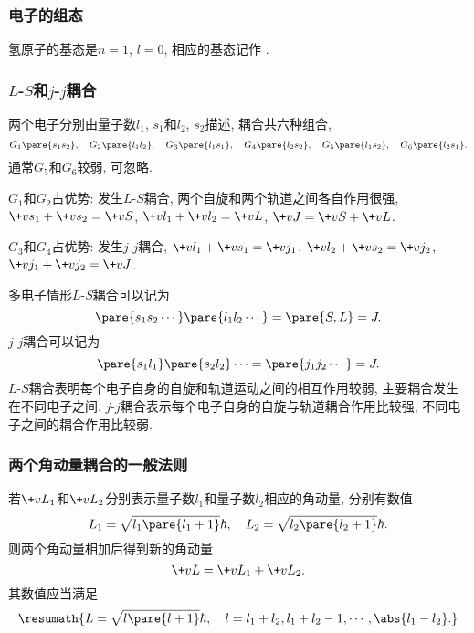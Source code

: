 \documentclass[hidelinks]{ctexart}
\begin{document}
\subsubsection{电子的组态} %
\label{ssub:电子的组态}

氢原子的基态是$n=1$, $l=0$, 相应的基态记作 .


\subsubsection{\texorpdfstring{$L$-$S$}{L-S}和\texorpdfstring{$j$-$j$}{j-j}耦合} %
\label{ssub:l_s和j_j耦合}

两个电子分别由量子数$l_1$, $s_1$和$l_2$, $s_2$描述, 耦合共六种组合,
\[ G_1\pare{s_1s_2},\quad G_2\pare{l_1l_2},\quad G_3\pare{l_1s_1},\quad G_4\pare{l_2s_2},\quad G_5\pare{l_1s_2},\quad G_6\pare{l_2s_1}. \]
通常$G_5$和$G_6$较弱, 可忽略.
\begin{cenum}
    \item $G_1$和$G_2$占优势: 发生$L$-$S$耦合, 两个自旋和两个轨道之间各自作用很强, $\+vs_1 + \+vs_2 = \+vS$, $\+vl_1 + \+vl_2 = \+vL$, $\+vJ = \+vS + \+vL$.
    \item $G_3$和$G_4$占优势: 发生$j$-$j$耦合, $\+vl_1 + \+vs_1 = \+vj_1$, $\+vl_2 + \+vs_2 = \+vj_2$, $\+vj_1 + \+vj_2 = \+vJ$.
\end{cenum}
多电子情形$L$-$S$耦合可以记为
\[ \pare{s_1s_2\cdots}\pare{l_1l_2\cdots} = \pare{S,L} = J. \]
$j$-$j$耦合可以记为
\[ \pare{s_1l_1}\pare{s_2l_2}\cdots = \pare{j_1j_2\cdots} = J. \]
$L$-$S$耦合表明每个电子自身的自旋和轨道运动之间的相互作用较弱, 主要耦合发生在不同电子之间. $j$-$j$耦合表示每个电子自身的自旋与轨道耦合作用比较强, 不同电子之间的耦合作用比较弱.


\subsubsection{两个角动量耦合的一般法则} %
\label{ssub:两个角动量耦合的一般法则}

若$\+vL_1$和$\+vL_2$分别表示量子数$l_1$和量子数$l_2$相应的角动量, 分别有数值
\[ L_1 = \sqrt{l_1 \pare{l_1 + 1}}\hbar,\quad L_2 = \sqrt{l_2\pare{l_2+1}}\hbar. \]
则两个角动量相加后得到新的角动量
\[ \+vL = \+vL_1 + \+vL_2. \]
其数值应当满足
\[ \resumath{L = \sqrt{l\pare{l+1}}\hbar,\quad l = l_1+l_2, l_1+l_2-1,\cdots,\abs{l_1-l_2}.} \]

\end{document}
